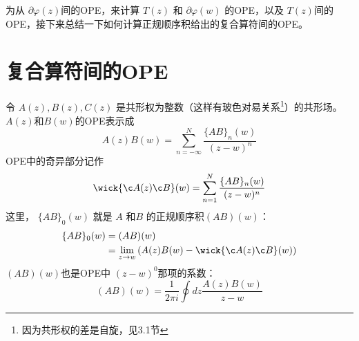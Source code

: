 为从 $\partial \varphi(z) $间的OPE，来计算 $T(z)$ 和 $\partial \varphi(w)$ 的OPE，以及 $T(z) $间的OPE，接下来总结一下如何计算正规顺序积给出的复合算符间的OPE。

\section{复合算符间的OPE}
令 $A(z),B(z),C(z)$ 是共形权为整数（这样有玻色对易关系\footnote{因为共形权的差是自旋，见3.1节}）的共形场。 $A(z) 和 B(w) $的OPE表示成
\begin{equation}
	A(z) B(w)=\sum_{n=-\infty}^{N} \frac{\{A B\}_{n}(w)}{(z-w)^{n}}
\end{equation}
OPE中的奇异部分记作
\begin{equation}
	\wick{\c A(z) \c B}(w)=\sum_{n=1}^{N} \frac{\{A B\}_{n}(w)}{(z-w)^{n}}
\end{equation}
这里， $\{AB\}_0(w)$ 就是 $A$ 和$ B$ 的正规顺序积$ (AB)(w) $：
\begin{equation}
	\begin{aligned} \{A B\}_{0}(w) &=(A B)(w) \\ &=\lim _{z \rightarrow w}\left(A(z) B(w)-	\wick{\c A(z) \c B}(w)\right) \end{aligned}
\end{equation}
$(AB)(w) $也是OPE中 $(z-w)^0$那项的系数：
\begin{equation}
	(A B)(w)=\frac{1}{2 \pi i} \oint d z \frac{A(z) B(w)}{z-w}
\end{equation}

